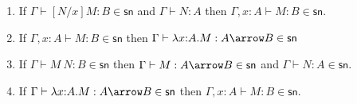 \documentclass{article}
\newcommand{\csn}{\mathsf{sn}}
\newcommand{\red}{\longrightarrow}
\begin{document}
\begin{lemma}\label{lem:psn}$\;$
  \begin{enumerate}
  \item\label{pp3} If $\Gamma \vdash [N/x]M : B \in \csn$ and $\Gamma \vdash N : A$ then $\Gamma, x{:}A \vdash M : B \in \csn$.
  \item\label{pp4} If $\Gamma, x{:}A \vdash M : B \in \csn$ then $\Gamma \vdash  \lambda x{:}A.M : A \arrow B \in \csn$
  \item\label{pp6} If $\Gamma \vdash M~N : B \in \csn$ then
     $\Gamma \vdash M : A \arrow B \in \csn$ and $\Gamma \vdash N : A\in \csn$.
  \item\label{pp7} If $\Gamma \vdash \lambda x{:}A.M : A \arrow B \in \csn$
     then $\Gamma, x{:}A \vdash M : B \in \csn$.

  \end{enumerate}
\end{lemma}
\end{document}
